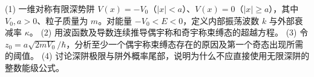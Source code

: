 (1) 一维对称有限深势阱 \(V(x)=-V_0\)（\(|x|<a\)）、\(V(x)=0\)（\(|x|\ge a\)），其中 \(V_0,a>0\)、粒子质量为 \(m\)。对能量 \(-V_0<E<0\)，定义内部振荡波数 \(k\) 与外部衰减率 \(\kappa\)。
(2) 用波函数及导数连续推导偶宇称和奇宇称束缚态的超越方程。
(3) 令 \(z_0=a\sqrt{2mV_0}/\hbar\)，分析至少一个偶宇称束缚态存在的原因及第一个奇态出现所需的阈值。
(4) 讨论深阱极限与阱外概率尾部，说明为什么不应直接使用无限深阱的整数能级公式。
